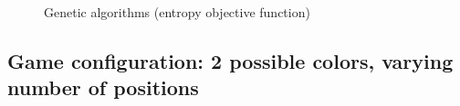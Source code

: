 \documentclass[11pt]{article}
\begin{document}
\begin{figure}[h!]
\centering
{}
\caption{Genetic algorithms (entropy objective function)}
\label{fig:gaentropy}
\end{figure}

\newpage

\subsection*{Game configuration: 2 possible colors, varying number of positions}
\end{document}
